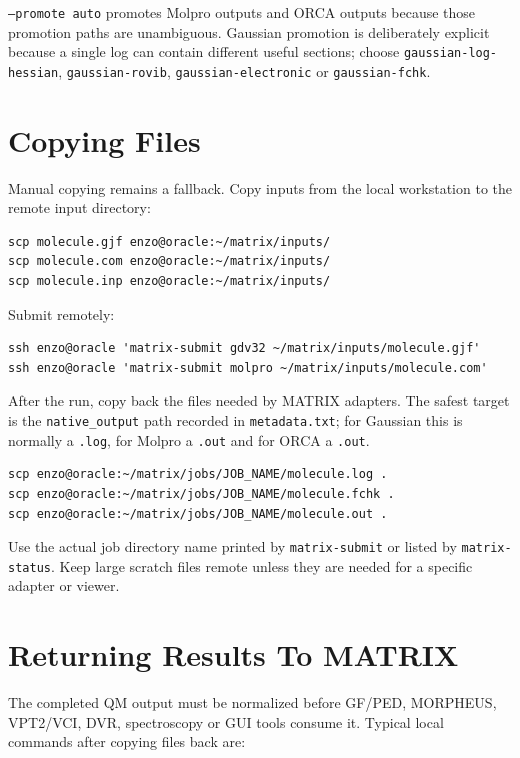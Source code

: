 \documentclass[11pt]{article}
\begin{document}
\texttt{--promote auto} promotes Molpro outputs and ORCA outputs because those
promotion paths are unambiguous.  Gaussian promotion is deliberately explicit
because a single log can contain different useful sections; choose
\texttt{gaussian-log-hessian}, \texttt{gaussian-rovib},
\texttt{gaussian-electronic} or \texttt{gaussian-fchk}.

\section{Copying Files}

Manual copying remains a fallback.  Copy inputs from the local workstation to
the remote input directory:

\begin{lstlisting}[style=matrix]
scp molecule.gjf enzo@oracle:~/matrix/inputs/
scp molecule.com enzo@oracle:~/matrix/inputs/
scp molecule.inp enzo@oracle:~/matrix/inputs/
\end{lstlisting}

Submit remotely:

\begin{lstlisting}[style=matrix]
ssh enzo@oracle 'matrix-submit gdv32 ~/matrix/inputs/molecule.gjf'
ssh enzo@oracle 'matrix-submit molpro ~/matrix/inputs/molecule.com'
\end{lstlisting}

After the run, copy back the files needed by MATRIX adapters.  The safest
target is the \texttt{native\_output} path recorded in
\texttt{metadata.txt}; for Gaussian this is normally a \texttt{.log}, for
Molpro a \texttt{.out} and for ORCA a \texttt{.out}.

\begin{lstlisting}[style=matrix]
scp enzo@oracle:~/matrix/jobs/JOB_NAME/molecule.log .
scp enzo@oracle:~/matrix/jobs/JOB_NAME/molecule.fchk .
scp enzo@oracle:~/matrix/jobs/JOB_NAME/molecule.out .
\end{lstlisting}

Use the actual job directory name printed by \texttt{matrix-submit} or listed
by \texttt{matrix-status}.  Keep large scratch files remote unless they are
needed for a specific adapter or viewer.

\section{Returning Results To MATRIX}

The completed QM output must be normalized before GF/PED, MORPHEUS,
VPT2/VCI, DVR, spectroscopy or GUI tools consume it.  Typical local commands
after copying files back are:
\end{document}
